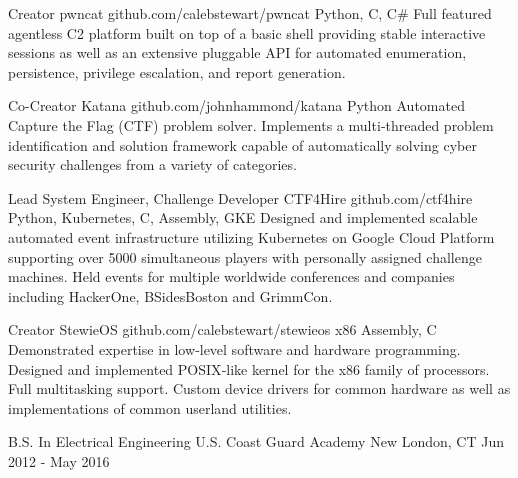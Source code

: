 \documentclass[11pt, letterpaper]{awesome-cv}
\begin{document}
\begin{cventries}

  \cventry
    {Creator}
    {pwncat}
    {github.com/calebstewart/pwncat}
    {Python, C, C\#}
    {Full featured agentless C2 platform built on top of a basic shell providing stable interactive sessions as well as an extensive pluggable API for automated enumeration, persistence, privilege escalation, and report generation.}

  \cventry
    {Co-Creator}
    {Katana}
    {github.com/johnhammond/katana}
    {Python}
    {Automated Capture the Flag (CTF) problem solver. Implements a multi‑threaded problem identification and solution framework capable of automatically solving cyber security challenges from a variety of categories.}

  \cventry
    {Lead System Engineer, Challenge Developer}
    {CTF4Hire}
    {github.com/ctf4hire}
    {Python, Kubernetes, C, Assembly, GKE}
    {Designed and implemented scalable automated event infrastructure utilizing Kubernetes on Google Cloud Platform supporting over 5000 simultaneous players with personally assigned challenge machines. Held events for multiple worldwide conferences and companies including HackerOne, BSidesBoston and GrimmCon.}

  \cventry
    {Creator}
    {StewieOS}
    {github.com/calebstewart/stewieos}
    {x86 Assembly, C}
    {Demonstrated expertise in low‑level software and hardware programming. Designed and implemented POSIX‑like kernel for the x86 family of processors. Full multitasking support. Custom device drivers for common hardware as well as implementations of common userland utilities.}


\end{cventries}

\begin{cventries}

  \cventry
    {B.S. In Electrical Engineering}
    {U.S. Coast Guard Academy}
    {New London, CT}
    {Jun 2012 - May 2016}
    {
    }


\end{cventries}

\end{document}
